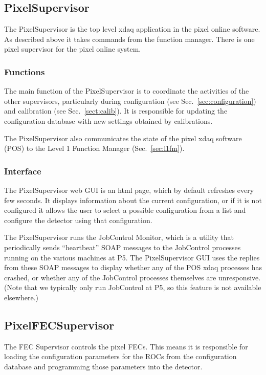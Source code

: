 \subsection{PixelSupervisor}
The PixelSupervisor is the top level xdaq application
in the pixel online software. As described above it takes
commands from the function manager. There is one pixel
supervisor for the pixel online system.

\subsubsection{Functions}
The main function of the PixelSupervisor is to coordinate the
activities of the other supervisors, particularly during configuration
(see Sec.~\ref{sec:configuration}) and calibration (see
Sec.~\ref{sect:calib}). It is responsible for updating the
configuration database with new settings obtained by calibrations.

The PixelSupervisor also communicates the state of the pixel
xdaq software (POS) to the Level 1 Function Manager (Sec.~\ref{sec:l1fm}).

\subsubsection{Interface}
The PixelSupervisor web GUI is an html page, which by default
refreshes every few seconds. It displays information about the current
configuration, or if it is not configured it allows the user to select
a possible configuration from a list and configure the detector using
that configuration.

The PixelSupervisor runs the JobControl Monitor, which is a utility
that periodically sends ``heartbeat'' SOAP messages to the JobControl
processes running on the various machines at P5. The PixelSupervisor
GUI uses the replies from these SOAP messages to display whether any of
the POS xdaq processes has crashed, or whether any of the JobControl
processes themselves are unresponsive. (Note that we typically only
run JobControl at P5, so this feature is not available elsewhere.)

\subsection{PixelFECSupervisor}
The FEC Supervisor controls the pixel FECs. This means it is
responsible for loading the configuration parameters for the ROCs from
the configuration database and programming those parameters into the
detector.

